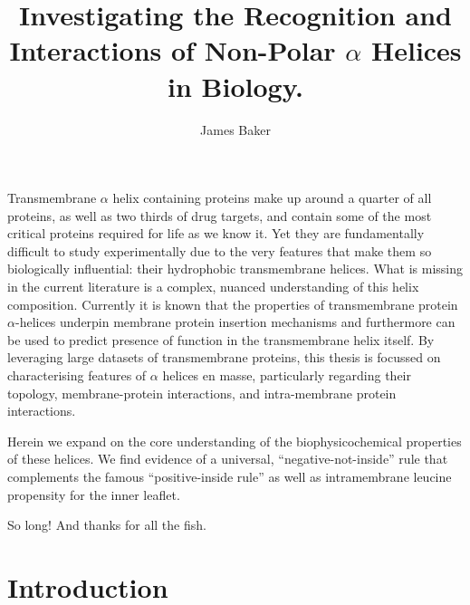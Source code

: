 \documentclass[12pt,PhD,twoside]{muthesis}
\begin{document}
\title{Investigating the Recognition and Interactions of Non-Polar $\alpha$ Helices in Biology.}
\author{James Baker}
\def\wordcount{xxxxx}




\beforeabstract

Transmembrane $\alpha$ helix containing proteins make up around a quarter of all proteins, as well as two thirds of drug targets, and contain some of the most critical proteins required for life as we know it. Yet they are fundamentally difficult to study experimentally due to the very features that make them so biologically influential: their hydrophobic transmembrane helices. What is missing in the current literature is a complex, nuanced understanding of this helix composition. Currently it is known that the properties of transmembrane protein $\alpha$-helices underpin membrane protein insertion mechanisms and furthermore can be used to predict presence of function in the transmembrane helix itself. By leveraging large datasets of transmembrane proteins, this thesis is focussed on characterising features of $\alpha$ helices en masse, particularly regarding their topology, membrane-protein interactions, and intra-membrane protein interactions.

Herein we expand on the core understanding of the biophysicochemical properties of these helices. We find evidence of a universal, ``negative-not-inside'' rule that complements the famous ``positive-inside rule'' as well as intramembrane leucine propensity for the inner leaflet.

\afterabstract

So long! And thanks for all the fish.


\afterpreface %

\chapter{Introduction}
\end{document}

